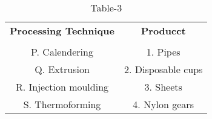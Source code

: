 \begin{table}[htbp]
  \centering
  \caption{Table-3}
  \label{tab:tables/table3.tex}
  \begin{tabular}{cc}
  \textbf{Processing Technique} & \textbf{Producct} \\ \\
    P. Calendering & 1. Pipes \\
    Q. Extrusion & 2. Disposable cups \\
    R. Injection moulding & 3. Sheets \\
    S. Thermoforming & 4. Nylon gears \\
  \end{tabular}
\end{table}